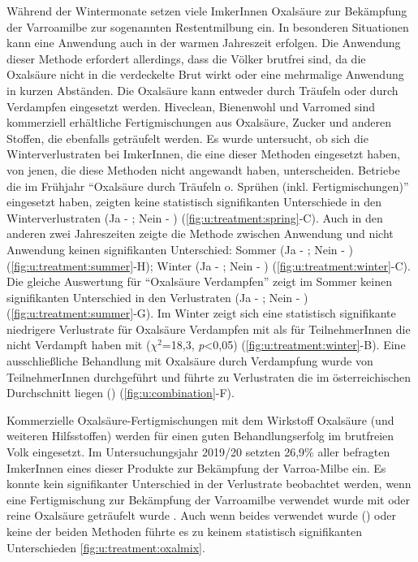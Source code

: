 Während der Wintermonate setzen viele ImkerInnen Oxalsäure zur Bekämpfung der Varroamilbe zur sogenannten Restentmilbung ein. In besonderen Situationen kann eine Anwendung auch in der warmen Jahreszeit erfolgen. Die Anwendung dieser Methode erfordert allerdings, dass die Völker brutfrei sind, da die Oxalsäure nicht in die verdeckelte Brut wirkt oder eine mehrmalige Anwendung in kurzen Abständen.
\newline
Die Oxalsäure kann entweder durch Träufeln oder durch Verdampfen eingesetzt werden. Hiveclean, Bienenwohl und Varromed sind
kommerziell erhältliche Fertigmischungen aus Oxalsäure, Zucker und anderen Stoffen, die ebenfalls geträufelt werden. Es wurde untersucht, ob sich die Winterverlustraten bei ImkerInnen, die eine dieser Methoden eingesetzt haben, von jenen, die diese Methoden nicht angewandt haben, unterscheiden.
\newline
Betriebe die im Frühjahr \enquote{Oxalsäure durch Träufeln o. Sprühen (inkl. Fertigmischungen)} eingesetzt haben, zeigten keine statistisch signifikanten Unterschiede in den Winterverlustraten (Ja - ; Nein - ) (\cref{fig:u:treatment:spring}-C). Auch in den anderen zwei Jahreszeiten zeigte die Methode zwischen Anwendung und nicht Anwendung keinen signifikanten Unterschied: Sommer (Ja - ; Nein - ) (\cref{fig:u:treatment:summer}-H); Winter (Ja - ; Nein - ) (\cref{fig:u:treatment:winter}-C).
\newline
Die gleiche Auswertung für \enquote{Oxalsäure Verdampfen} zeigt im Sommer keinen signifikanten Unterschied in den Verlustraten (Ja - ; Nein - ) (\cref{fig:u:treatment:summer}-G). Im Winter zeigt sich eine statistisch signifikante niedrigere Verlustrate für Oxalsäure Verdampfen mit  als für TeilnehmerInnen die nicht Verdampft haben mit  ($\chi^{2}$=18,3, \textit{p}<0,05) (\cref{fig:u:treatment:winter}-B). Eine ausschließliche Behandlung mit Oxalsäure durch Verdampfung wurde von  TeilnehmerInnen durchgeführt und führte zu Verlustraten die im österreichischen Durchschnitt liegen () (\cref{fig:u:combination}-F).

\label{sss:mischungox:u}

Kommerzielle Oxalsäure-Fertigmischungen mit dem Wirkstoff Oxalsäure (und weiteren Hilfsstoffen) werden für einen guten Behandlungserfolg im brutfreien Volk eingesetzt. Im Untersuchungsjahr 2019/20 setzten 26,9\% aller befragten ImkerInnen eines dieser Produkte zur Bekämpfung der Varroa-Milbe ein. Es konnte kein signifikanter Unterschied in der Verlustrate beobachtet werden, wenn eine Fertigmischung zur Bekämpfung der Varroamilbe verwendet wurde mit  oder reine Oxalsäure geträufelt wurde .
Auch wenn beides verwendet wurde () oder keine der beiden Methoden  führte es zu keinem statistisch signifikanten Unterschieden \cref{fig:u:treatment:oxalmix}.

